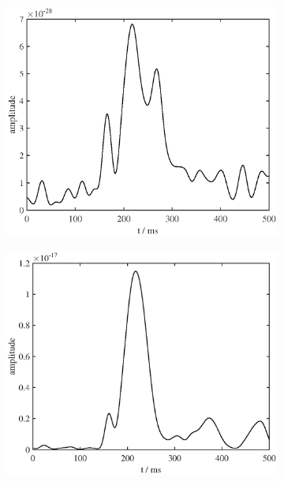 \documentclass[doc,a4paper,12pt]{apa6}
\begin{document}
\begin{figure}
\begin{subfigure}[c]{0.47\textwidth}
    \label{img:pa07:zeit:sss-mne}
  \end{subfigure}\vspace*{0.04\textwidth}
  \begin{subfigure}[c]{0.47\textwidth}
    \includegraphics[width=\textwidth]{ergebnisse/pa07/pa07_eve2_mc_lcmv_timecourse.eps}
    \label{img:pa07:zeit:mc-lcmv}
  \end{subfigure}\hspace*{0.05\textwidth}
  \begin{subfigure}[c]{0.47\textwidth}
    \includegraphics[width=\textwidth]{ergebnisse/pa07/pa07_eve2_mc_mne_timecourse.eps}

\end{subfigure}
\end{figure}
\end{document}
